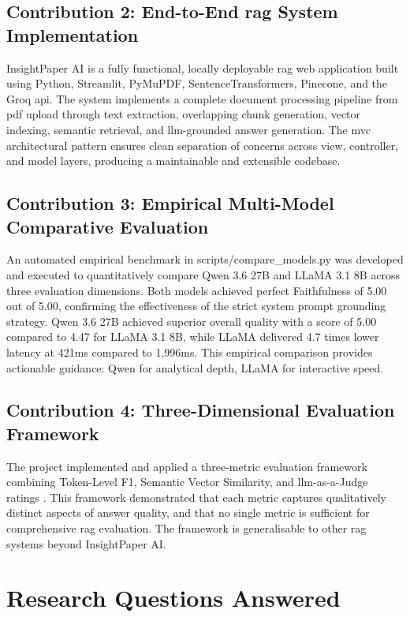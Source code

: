 \subsection{Contribution 2: End-to-End \gls{rag} System Implementation}

InsightPaper AI is a fully functional, locally deployable \gls{rag} web application built using Python, Streamlit, PyMuPDF, SentenceTransformers, Pinecone, and the Groq \gls{api}. The system implements a complete document processing pipeline from \gls{pdf} upload through text extraction, overlapping chunk generation, vector indexing, semantic retrieval, and \gls{llm}-grounded answer generation. The \gls{mvc} architectural pattern ensures clean separation of concerns across view, controller, and model layers, producing a maintainable and extensible codebase.

\subsection{Contribution 3: Empirical Multi-Model Comparative Evaluation}

An automated empirical benchmark in scripts/compare\_models.py was developed and executed to quantitatively compare Qwen 3.6 27B and LLaMA 3.1 8B across three evaluation dimensions. Both models achieved perfect Faithfulness of 5.00 out of 5.00, confirming the effectiveness of the strict system prompt grounding strategy. Qwen 3.6 27B achieved superior overall quality with a score of 5.00 compared to 4.47 for LLaMA 3.1 8B, while LLaMA delivered 4.7 times lower latency at 421ms compared to 1,996ms. This empirical comparison provides actionable guidance: Qwen for analytical depth, LLaMA for interactive speed.

\subsection{Contribution 4: Three-Dimensional Evaluation Framework}

The project implemented and applied a three-metric evaluation framework combining Token-Level F1, Semantic Vector Similarity, and \gls{llm}-as-a-Judge ratings \citep{zheng2023judging}. This framework demonstrated that each metric captures qualitatively distinct aspects of answer quality, and that no single metric is sufficient for comprehensive \gls{rag} evaluation. The framework is generalisable to other \gls{rag} systems beyond InsightPaper AI.

\section{Research Questions Answered}

